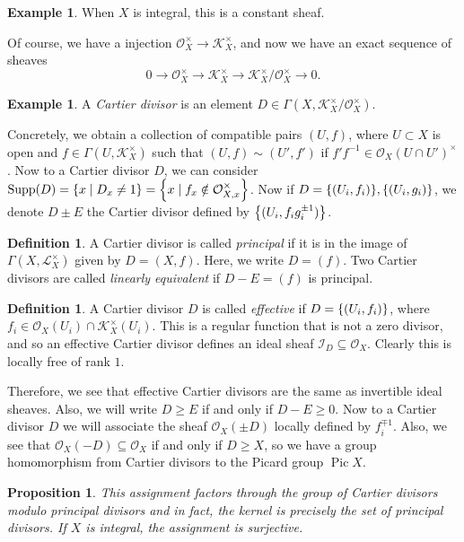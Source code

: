 \documentclass[leqno, openany]{memoir}
\newtheorem{prop}[thm]{Proposition}
\theoremstyle{definition}
\newtheorem{defn}[thm]{Definition}
\newtheorem{exm}[thm]{Example}
\theoremstyle{remark}
\theoremstyle{plain}
\theoremstyle{definition}
\theoremstyle{remark}
\newcommand{\mc}[1]{\mathcal{#1}}
\DeclareMathOperator{\Supp}{Supp}
\DeclareMathOperator{\Pic}{Pic}
\begin{document}
\begin{exm} When $X$ is integral, this is a constant sheaf.  \end{exm}

Of course, we have a injection $\mc{O}_X^{\times} \to {\mc{K}_X^{\times}}$, and
now we have an exact sequence of sheaves \[ 0 \to \mc{O}_X^{\times} \to
\mc{K}_X^{\times} \to \mc{K}_X^{\times} / \mc{O}_X^{\times} \to 0. \]

\begin{exm} A \textit{Cartier divisor} is an element $D \in \Gamma(X,
\mc{K}_X^{\times} / \mc{O}_X^{\times})$.  \end{exm}

Concretely, we obtain a collection of compatible pairs $(U,f)$, where $U
\subset X$ is open and $f \in \Gamma(U, \mc{K}_X^{\times})$ such that $(U, f)
\sim (U', f')$ if $f' f^{-1} \in {\mc{O}_X(U \cap U')}^{\times}$. Now to a
Cartier divisor $D$, we can consider $\Supp(D) = \qty{x \mid D_x \neq 1} =
\qty{x \mid f_x \notin \mc{O}_{X,x}^{\times}}$. Now if $D = \qty{(U_i, f_i)},
\qty{(U_i, g_i)}$, we denote $D \pm E$ the Cartier divisor defined by
$\qty{(U_i, f_i g_i^{\pm 1})}$.

\begin{defn} A Cartier divisor is called \textit{principal} if it is in the
    image of $\Gamma(X, \mc{L}_X^{\times})$ given by $D = {(X, f)}$. Here, we
    write $D = (f)$. Two Cartier divisors are called \textit{linearly
    equivalent} if $D-E = (f)$ is principal.  \end{defn}

\begin{defn} A Cartier divisor $D$ is called \textit{effective} if $D =
    \qty{(U_i, f_i)}$, where $f_i \in \mc{O}_X(U_i) \cap
    \mc{K}_X^{\times}(U_i)$. This is a regular function that is not a zero
    divisor, and so an effective Cartier divisor defines an ideal sheaf
    $\mc{I}_D \subseteq \mc{O}_X$. Clearly this is locally free of rank $1$.
\end{defn}

Therefore, we see that effective Cartier divisors are the same as invertible
ideal sheaves. Also, we will write $D \geq E$ if and only if $D - E \geq 0$.
Now to a Cartier divisor $D$ we will associate the sheaf $\mc{O}_X(\pm D)$
locally defined by $f_i^{\mp 1}$. Also, we see that $\mc{O}_X(-D) \subseteq
\mc{O}_X$ if and only if $D \geq X$, so we have a group homomorphism from
Cartier divisors to the Picard group $\Pic X$.

\begin{prop} This assignment factors through the group of Cartier divisors
modulo principal divisors and in fact, the kernel is precisely the set of
principal divisors. If $X$ is integral, the assignment is surjective.
\end{prop}
\end{document}
